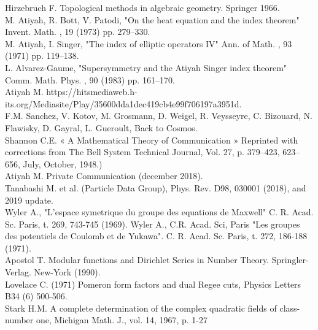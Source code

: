 \documentclass[preprint,12pt]{elsarticle}
\begin{document}


  
\begin{thebibliography}{99}
 Hirzebruch F. Topological methods in algebraic geometry. Springer 1966.\\
 M. Atiyah, R. Bott, V. Patodi, "On the heat equation and the index theorem" Invent. Math. , 19 (1973) pp. 279--330.\\
 M. Atiyah, I. Singer, "The index of elliptic operators IV" Ann. of Math. , 93 (1971) pp. 119--138. \\
 L. Alvarez-Gaume, "Supersymmetry and the Atiyah Singer index theorem" Comm. Math. Phys. , 90 (1983) pp. 161--170.\\
 Atiyah M. https://hitsmediaweb.h-its.org/Mediasite/Play/35600dda1dec419cb4e99f706197a3951d. \\ 
 F.M. Sanchez, V. Kotov, M. Grosmann, D. Weigel, R. Veysseyre, C. Bizouard, N. Flawisky, D. Gayral, L. Gueroult, Back to Cosmos.\\
 Shannon C.E. « A Mathematical Theory of Communication » Reprinted with corrections from The Bell System Technical Journal, Vol. 27, p. 379–423, 623–656, July, October, 1948.)\\
 Atiyah M. Private Communication (december 2018).\\
 Tanabashi M. et al. (Particle Data Group), Phys. Rev. D98, 030001 (2018), and 2019 update.\\
 Wyler A., "L'espace symetrique du groupe des equations de Maxwell" C. R. Acad. Sc. Paris, t. 269, 743-745 (1969). Wyler A., C.R. Acad. Sci, Paris "Les groupes des potentiels de Coulomb et de Yukawa". C. R. Acad. Sc. Paris, t. 272, 186-188 (1971).\\
 Apostol T. Modular functions and Dirichlet Series in Number Theory. Springler-Verlag. New-York (1990).\\
 Lovelace C. (1971) Pomeron form factors and dual Regee cuts, Physics Letters B34 (6) 500-506.\\
 Stark H.M. A complete determination of the complex quadratic fields of class-number one, Michigan Math. J., vol. 14,‎ 1967, p. 1-27  \\

\end{thebibliography}
\end{document}
